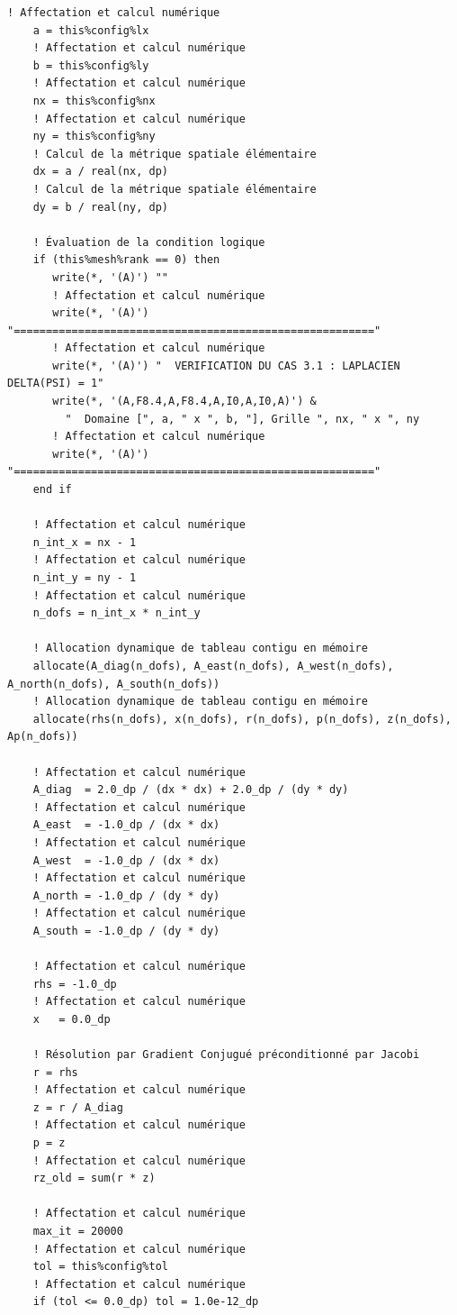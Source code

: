 \documentclass[10pt,a4paper,oneside]{book}
\begin{document}
\begin{lstlisting}[language={[95]Fortran}]
    ! Affectation et calcul numérique
    a = this%config%lx
    ! Affectation et calcul numérique
    b = this%config%ly
    ! Affectation et calcul numérique
    nx = this%config%nx
    ! Affectation et calcul numérique
    ny = this%config%ny
    ! Calcul de la métrique spatiale élémentaire
    dx = a / real(nx, dp)
    ! Calcul de la métrique spatiale élémentaire
    dy = b / real(ny, dp)

    ! Évaluation de la condition logique
    if (this%mesh%rank == 0) then
       write(*, '(A)') ""
       ! Affectation et calcul numérique
       write(*, '(A)') "========================================================"
       ! Affectation et calcul numérique
       write(*, '(A)') "  VERIFICATION DU CAS 3.1 : LAPLACIEN DELTA(PSI) = 1"
       write(*, '(A,F8.4,A,F8.4,A,I0,A,I0,A)') &
         "  Domaine [", a, " x ", b, "], Grille ", nx, " x ", ny
       ! Affectation et calcul numérique
       write(*, '(A)') "========================================================"
    end if

    ! Affectation et calcul numérique
    n_int_x = nx - 1
    ! Affectation et calcul numérique
    n_int_y = ny - 1
    ! Affectation et calcul numérique
    n_dofs = n_int_x * n_int_y

    ! Allocation dynamique de tableau contigu en mémoire
    allocate(A_diag(n_dofs), A_east(n_dofs), A_west(n_dofs), A_north(n_dofs), A_south(n_dofs))
    ! Allocation dynamique de tableau contigu en mémoire
    allocate(rhs(n_dofs), x(n_dofs), r(n_dofs), p(n_dofs), z(n_dofs), Ap(n_dofs))

    ! Affectation et calcul numérique
    A_diag  = 2.0_dp / (dx * dx) + 2.0_dp / (dy * dy)
    ! Affectation et calcul numérique
    A_east  = -1.0_dp / (dx * dx)
    ! Affectation et calcul numérique
    A_west  = -1.0_dp / (dx * dx)
    ! Affectation et calcul numérique
    A_north = -1.0_dp / (dy * dy)
    ! Affectation et calcul numérique
    A_south = -1.0_dp / (dy * dy)

    ! Affectation et calcul numérique
    rhs = -1.0_dp
    ! Affectation et calcul numérique
    x   = 0.0_dp

    ! Résolution par Gradient Conjugué préconditionné par Jacobi
    r = rhs
    ! Affectation et calcul numérique
    z = r / A_diag
    ! Affectation et calcul numérique
    p = z
    ! Affectation et calcul numérique
    rz_old = sum(r * z)

    ! Affectation et calcul numérique
    max_it = 20000
    ! Affectation et calcul numérique
    tol = this%config%tol
    ! Affectation et calcul numérique
    if (tol <= 0.0_dp) tol = 1.0e-12_dp


\end{lstlisting}
\end{document}
